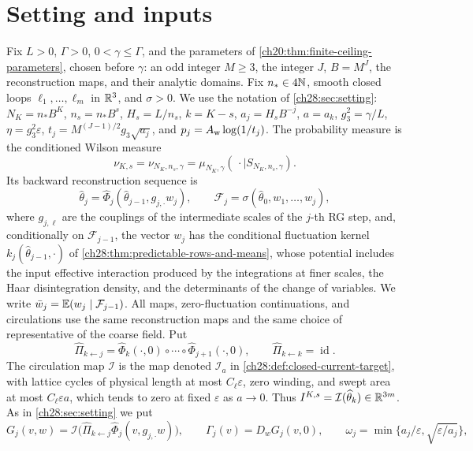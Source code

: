 \section{Setting and inputs}\label{ch29:sec:setting}

\begin{definition}\label{ch29:def:current-chain}
Fix $L>0$, $\Gamma>0$, $0<\gamma\le\Gamma$, and the parameters of \cref{ch20:thm:finite-ceiling-parameters}, chosen before $\gamma$: an odd integer $M\ge3$, the integer $J$, $B=M^J$, the reconstruction maps, and their analytic domains. Fix $n_*\in4\mathbb N$, smooth closed loops $\ell_1,\dots,\ell_m$ in $\mathbb R^3$, and $\sigma>0$. We use the notation of \cref{ch28:sec:setting}: $N_K=n_*B^K$, $n_s=n_*B^s$, $H_s=L/n_s$, $k=K-s$, $a_j=H_sB^{-j}$, $a=a_k$, $g_3^2=\gamma/L$, $\eta=g_3^2\varepsilon$, $t_j=M^{(J-1)/2}g_3\sqrt{a_j}$, and $p_j=A_{\rm w}\log(1/t_j)$. The probability measure is the conditioned Wilson measure
\[
 \nu_{K,s}=\nu_{N_K,n_s,\gamma}=\mu_{N_K,\gamma}(\,\cdot\mid S_{N_K,n_s,\gamma}).
\]
Its backward reconstruction sequence is
\[
 \widehat\theta_j=\widehat\Phi_j(\widehat\theta_{j-1},g_{j,\cdot}w_j),\qquad \mathcal F_j=\sigma(\widehat\theta_0,w_1,\dots,w_j),
\]
where $g_{j,\ell}$ are the couplings of the intermediate scales of the $j$-th RG step, and, conditionally on $\mathcal F_{j-1}$, the vector $w_j$ has the conditional fluctuation kernel $k_j(\widehat\theta_{j-1},\cdot)$ of \cref{ch28:thm:predictable-rows-and-means}, whose potential includes the input effective interaction produced by the integrations at finer scales, the Haar disintegration density, and the determinants of the change of variables. We write $\bar w_j=\mathbb E(w_j\mid\mathcal F_{j-1})$. All maps, zero-fluctuation continuations, and circulations use the same reconstruction maps and the same choice of representative of the coarse field. Put
\[
 \widehat\Pi_{k\leftarrow j}=\widehat\Phi_k(\cdot,0)\circ\cdots\circ\widehat\Phi_{j+1}(\cdot,0),\qquad \widehat\Pi_{k\leftarrow k}=\operatorname{id}.
\]
The circulation map $\mathcal I$ is the map denoted $\mathcal I_a$ in \cref{ch28:def:closed-current-target}, with lattice cycles of physical length at most $C_\ell\varepsilon$, zero winding, and swept area at most $C_\ell\varepsilon a$, which tends to zero at fixed $\varepsilon$ as $a\to0$. Thus $I^{K,s}=\mathcal I(\widehat\theta_k)\in\mathbb R^{3m}$. As in \cref{ch28:sec:setting} we put
\[
 G_j(v,w)=\mathcal I\bigl(\widehat\Pi_{k\leftarrow j}\widehat\Phi_j(v,g_{j,\cdot}w)\bigr),\qquad \Gamma_j(v)=D_wG_j(v,0),\qquad \omega_j=\min\{a_j/\varepsilon,\sqrt{\varepsilon/a_j}\},
\]
\end{definition}
